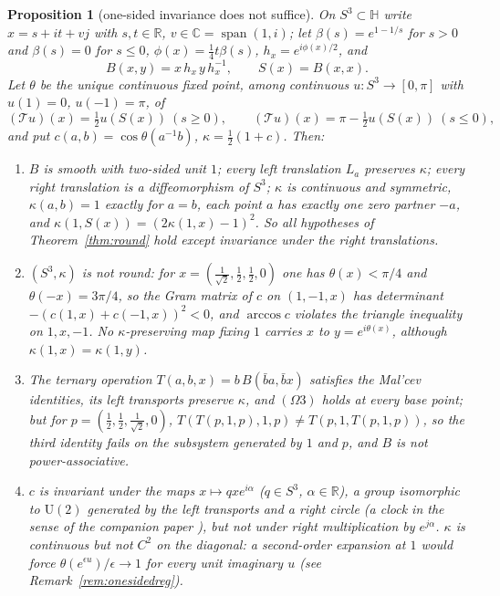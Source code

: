 \documentclass[11pt,reqno]{amsart}
\newtheorem{proposition}[theorem]{Proposition}
\theoremstyle{definition}
\theoremstyle{remark}
\numberwithin{equation}{section}
\newcommand{\R}{\mathbb{R}}
\newcommand{\C}{\mathbb{C}}
\newcommand{\HH}{\mathbb{H}}
\begin{document}
\begin{proposition}[one-sided invariance does not suffice]\label{prop:onesided}
On $S^3\subset\HH$ write $x=s+it+vj$ with $s,t\in\R$, $v\in\C=\operatorname{span}(1,i)$; let $\beta(s)=e^{1-1/s}$ for $s>0$ and $\beta(s)=0$ for $s\le0$,
$\phi(x)=\frac14t\beta(s)$, $h_x=e^{i\phi(x)/2}$, and
\[
B(x,y)=x\,h_x\,y\,h_x^{-1},\qquad S(x)=B(x,x).
\]
Let $\theta$ be the unique continuous fixed point, among continuous $u\colon S^3\to[0,\pi]$ with $u(1)=0$, $u(-1)=\pi$, of
\[
(\mathcal Tu)(x)=\tfrac12u(S(x))\ (s\ge0),\qquad (\mathcal Tu)(x)=\pi-\tfrac12u(S(x))\ (s\le0),
\]
and put $c(a,b)=\cos\theta(a^{-1}b)$, $\kappa=\frac12(1+c)$.  Then:
\begin{enumerate}[label=(\roman*)]
\item $B$ is smooth with two-sided unit $1$; every left translation $L_a$ preserves $\kappa$; every right translation is a diffeomorphism
of $S^3$; $\kappa$ is continuous and symmetric, $\kappa(a,b)=1$ exactly for $a=b$, each point $a$ has exactly one zero partner $-a$, and
$\kappa(1,S(x))=(2\kappa(1,x)-1)^2$.  So all hypotheses of Theorem~\ref{thm:round} hold except invariance under the right translations.
\item $(S^3,\kappa)$ is not round: for $x=(\frac1{\sqrt2},\frac12,\frac12,0)$ one has $\theta(x)<\pi/4$ and $\theta(-x)=3\pi/4$, so the Gram matrix of
$c$ on $(1,-1,x)$ has determinant $-(c(1,x)+c(-1,x))^2<0$, and $\arccos c$ violates the triangle inequality on $1,x,-1$.  No
$\kappa$-preserving map fixing $1$ carries $x$ to $y=e^{i\theta(x)}$, although $\kappa(1,x)=\kappa(1,y)$.
\item The ternary operation $T(a,b,x)=b\,B(\bar ba,\bar bx)$ satisfies the Mal'cev identities, its left transports preserve $\kappa$, and
$(\Omega3)$ holds at every base point; but for $p=(\frac12,\frac12,\frac1{\sqrt2},0)$, $T(T(p,1,p),1,p)\ne T(p,1,T(p,1,p))$, so the third identity
fails on the subsystem generated by $1$ and $p$, and $B$ is not power-associative.
\item $c$ is invariant under the maps $x\mapsto qxe^{i\alpha}$ ($q\in S^3$, $\alpha\in\R$), a group isomorphic to $\mathrm U(2)$ generated by the left
transports and a right circle (a clock in the sense of the companion paper \cite{Companion}), but not under right multiplication by
$e^{j\alpha}$.  $\kappa$ is continuous but not $C^2$ on the diagonal: a second-order expansion at $1$ would force $\theta(e^{\epsilon u})/\epsilon\to1$
for every unit imaginary $u$ (see Remark~\ref{rem:onesidedreg}).
\end{enumerate}
\end{proposition}
\end{document}
